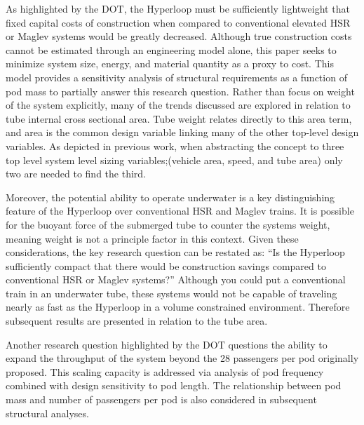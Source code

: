 	As highlighted by the DOT, the Hyperloop must be sufficiently lightweight
	that fixed capital costs of construction when compared to conventional
	elevated HSR or Maglev systems would be greatly decreased.
	Although true construction costs cannot be estimated through an engineering
	model alone, this paper seeks to minimize system size, energy, and material
	quantity as a proxy to cost. This model provides a sensitivity
	analysis of structural requirements as a function of pod mass to partially
	answer this research question. Rather than focus on weight of the system explicitly,
	many of the trends discussed are explored in relation to tube internal
	cross sectional area. Tube weight relates directly to this area term, and
	area is the common design variable linking many of the other top-level
	design variables. As depicted in previous work,
	\cite{Chin} when abstracting the concept to three top level system level
	sizing variables;(vehicle area, speed, and tube area) only two are needed
	to find the third.

	Moreover, the potential ability to operate underwater is a key distinguishing feature
	of the Hyperloop over conventional HSR and Maglev trains. It is possible for the buoyant force
	of the submerged tube to counter the systems weight, meaning weight is not
	a principle factor in this context.
	Given these considerations, the key research
	question can be restated as: ``Is the Hyperloop sufficiently compact that
	there would be construction savings compared to conventional
	HSR or Maglev systems?'' Although you could put a conventional train in an
	underwater tube, these systems would not be capable of traveling nearly as
	fast as the Hyperloop in a volume constrained environment.
	Therefore subsequent results are presented in relation to the tube area.

	Another research question highlighted by the DOT questions the ability to
	expand the throughput of the system beyond the 28 passengers per pod
	originally proposed. This scaling capacity is addressed
	via analysis of pod frequency combined with design sensitivity to pod length.
	The relationship between pod mass and number of passengers per pod is also
	considered in subsequent structural analyses.

